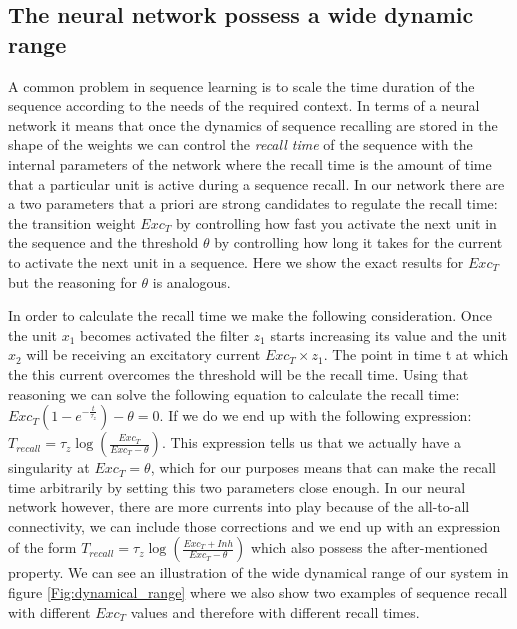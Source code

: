 \documentclass{esannV2}
\begin{document}
\subsection{The neural network possess a wide dynamic range}

A common problem in sequence learning is to scale the time duration of the sequence according to the needs of the required context. In terms of a neural network it means that once the dynamics of sequence recalling are stored in the shape of the weights we can control the \textit{recall time} of the sequence with the internal parameters of the network where the recall time is the amount of time that a particular unit is active during a sequence recall. In our network there are a two parameters that a priori are strong candidates to regulate the recall time: the transition weight $Exc_T$ by controlling how fast you activate the next unit in the sequence and the threshold $\theta$ by controlling how long it takes for the current to activate the next unit in a sequence. Here we show the exact results for $Exc_T$ but the reasoning for $\theta$ is analogous.  

In order to calculate the recall time we make the following consideration. Once the unit $x_1$ becomes activated the filter $z_1$ starts increasing its value and the unit $x_2$ will be receiving an excitatory current $Exc_T \times z_1$. The point in time t at which the this current overcomes the threshold will be the recall time. Using that reasoning we can solve the following equation to calculate the recall time: $Exc_{T}(1 - e^{-\frac{t}{\tau_z}}) - \theta = 0$. If we do we end up with the following expression: $T_{recall} = \tau_z \log(\frac{Exc_T}{Exc_T - \theta})$. This expression tells us that we actually have a singularity at $Exc_T = \theta$, which for our purposes means that can make the recall time arbitrarily by setting this two parameters close enough. In our neural network however, there are more currents into play because of the all-to-all connectivity, we can include those corrections and we end up with an expression of the form $T_{recall} = \tau_z \log(\frac{Exc_T + Inh}{Exc_T - \theta})$ which also possess the after-mentioned property. We can see an illustration of the wide dynamical range of our system in figure \ref{Fig:dynamical_range} where we also show two examples of sequence recall with different $Exc_T$ values and therefore with different recall times. 
\end{document}
